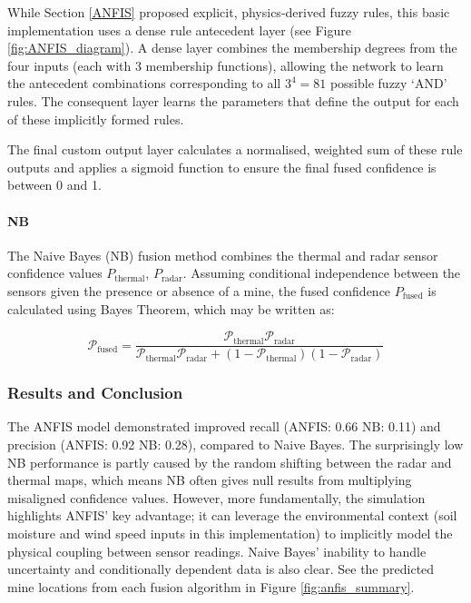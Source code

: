     While Section \ref{ANFIS} proposed explicit, physics-derived fuzzy rules, this basic implementation uses a dense rule antecedent layer (see Figure \ref{fig:ANFIS_diagram}). A dense layer combines the membership degrees from the four inputs (each with 3 membership functions), allowing the network to learn the antecedent combinations corresponding to all $3^4=81$ possible fuzzy `AND' rules. The consequent layer learns the parameters that define the output for each of these implicitly formed rules. 
    
    The final custom output layer calculates a normalised, weighted sum of these rule outputs and applies a sigmoid function to ensure the final fused confidence is between 0 and 1.

    \paragraph{NB} The Naive Bayes (NB) fusion method combines the thermal and radar sensor confidence values $P_{\text{thermal}}$, $P_{\text{radar}}$. Assuming conditional independence between the sensors given the presence or absence of a mine, the fused confidence $P_{\text{fused}}$ is calculated using Bayes Theorem, which may be written as:

    \begin{equation}
        \label{eq:bayes_fusion}
        \mathcal{P}_\text{fused} = \frac{\mathcal{P}_\text{thermal}\mathcal{P}_\text{radar}}{\mathcal{P}_\text{thermal}\mathcal{P}_\text{radar} + (1-\mathcal{P}_\text{thermal})(1-\mathcal{P}_\text{radar})}
    \end{equation}
    
\subsubsection{Results and Conclusion}  

    The ANFIS model demonstrated improved recall (ANFIS: 0.66 NB: 0.11) and precision (ANFIS: 0.92 NB: 0.28), compared to Naive Bayes. The surprisingly low NB performance is partly caused by the random shifting between the radar and thermal maps, which means NB often gives null results from multiplying misaligned confidence values. However, more fundamentally, the simulation highlights ANFIS' key advantage; it can leverage the environmental context (soil moisture and wind speed inputs in this implementation) to implicitly model the physical coupling between sensor readings. Naive Bayes' inability to handle uncertainty and conditionally dependent data is also clear. See the predicted mine locations from each fusion algorithm in Figure \ref{fig:anfis_summary}.

